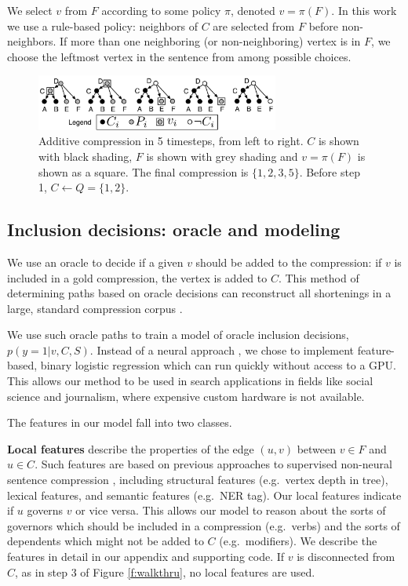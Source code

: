 \documentclass[11pt,a4paper]{article}
\begin{document}
We select $v$ from $F$ according to some policy $\pi$, denoted $v = \pi(F)$. In this work we use a rule-based policy: neighbors of $C$ are selected from $F$ before non-neighbors. If more than one neighboring (or non-neighboring) vertex is in $F$, we choose the leftmost vertex in the sentence from among possible choices.
 
\begin{figure}[h]
\includegraphics[width=8cm]{additive.pdf}
\caption{Additive compression in 5 timesteps, from left to right. $C$ is shown with black shading, $F$ is shown with grey shading and $v= \pi(F)$ is shown as a square. The final compression is $\{1,2,3,5\}$. Before step 1, $C \gets Q = \{1,2\}$. }
\end{figure}\label{f:walkthru}


\subsection{Inclusion decisions: oracle and modeling}\label{s:modeling}

We use an oracle to decide if a given $v$ should be added to the compression: if $v$ is included in a gold compression, the vertex is added to $C$. This method of determining paths based on oracle decisions can reconstruct all shortenings in a large, standard compression corpus \cite{filippova2013overcoming}.

We use such oracle paths to train a model of oracle inclusion decisions, $p(y  = 1 | v, C, S)$. Instead of a neural approach \cite{D14-1082}, we chose to implement feature-based, binary logistic regression which can run quickly without access to a GPU. This allows our method to be used in search applications in fields like social science and journalism, where expensive custom hardware is not available. 

The features in our model fall into two classes. 

\textbf{Local features} describe the properties of the edge $(u,v)$ between $v \in F$ and $u \in C$. Such features are based on previous approaches to supervised non-neural sentence compression \cite{filippova2013overcoming,almeida2013fast,Filippova2015FastKS}, including structural features (e.g.~vertex depth in tree), lexical features, and semantic features (e.g.~NER tag). Our local features indicate if $u$ governs $v$ or vice versa. This allows our model to reason about the sorts of governors which should be included in a compression (e.g.~verbs) and the sorts of dependents which might not be added to $C$ (e.g.~modifiers). We describe the features in detail in our appendix and supporting code. If $v$ is disconnected from $C$, as in step 3 of Figure \ref{f:walkthru}, no local features are used.
\end{document}
